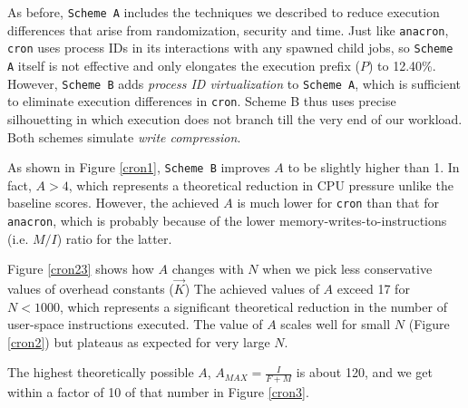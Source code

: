 As before, \texttt{Scheme A} includes the techniques we described to reduce
execution differences that arise from randomization, security and time.
Just like \texttt{anacron}, \texttt{cron} uses process IDs
in its interactions with any spawned child jobs,
so \texttt{Scheme A} itself is not effective and only elongates the 
execution prefix ($P$) to 12.40\%.
However, \texttt{Scheme B} adds {\em process ID virtualization} to
\texttt{Scheme A}, which is sufficient to eliminate
execution differences in \texttt{cron}.
{Scheme B} thus uses precise silhouetting
in which execution does not branch till the very end of our workload.
Both schemes simulate {\em write compression}.

As shown in Figure \ref{cron1}, \texttt{Scheme B} improves $A$ 
to be slightly higher than 1. In fact, $A > 4$, which represents                                                                                             
a theoretical reduction in CPU pressure unlike the baseline
scores. However, the achieved $A$ is much lower for \texttt{cron} than that for \texttt{anacron},
which is probably because of the lower memory-writes-to-instructions (i.e. $M/I$) ratio
for the latter.

Figure \ref{cron23} shows how $A$ changes with $N$ when we pick less conservative
values of overhead constants ($\vec K$) 
The achieved values of $A$ 
exceed 17 for $N < 1000$, which represents a significant
theoretical reduction in the number of user-space instructions
executed. The value of $A$ scales well for small $N$
(Figure \ref{cron2}) but plateaus as expected
for very large $N$.

The highest theoretically possible
$A$, $A_{MAX} = \frac{I}{F+M}$  is about 120, and we get within a factor of 10 of that number in Figure \ref{cron3}. 

